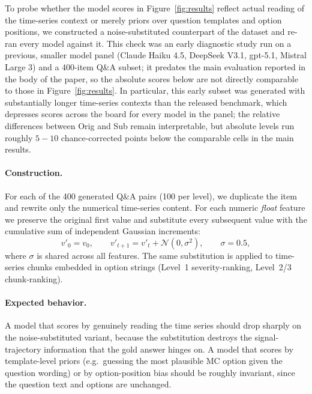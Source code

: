 \documentclass{article}
\begin{document}
To probe whether the model scores in Figure~\ref{fig:results} reflect actual reading of the time-series context or merely priors over question templates and option positions, we constructed a noise-substituted counterpart of the dataset and re-ran every model against it. This check was an early diagnostic study run on a previous, smaller model panel (Claude Haiku 4.5, DeepSeek V3.1, gpt-5.1, Mistral Large 3) and a 400-item Q\&A subset; it predates the main evaluation reported in the body of the paper, so the absolute scores below are not directly comparable to those in Figure~\ref{fig:results}. In particular, this early subset was generated with substantially longer time-series contexts than the released benchmark, which depresses scores across the board for every model in the panel; the relative differences between Orig and Sub remain interpretable, but absolute levels run roughly $5{-}10$ chance-corrected points below the comparable cells in the main results.

\paragraph{Construction.} For each of the 400 generated Q\&A pairs (100 per level), we duplicate the item and rewrite only the numerical time-series content. For each numeric \emph{float} feature we preserve the original first value and substitute every subsequent value with the cumulative sum of independent Gaussian increments:
\begin{equation*}
    v'_0 = v_0, \qquad v'_{t+1} = v'_t + \mathcal{N}(0, \sigma^2), \qquad \sigma = 0.5,
\end{equation*}
where $\sigma$ is shared across all features. The same substitution is applied to time-series chunks embedded in option strings (Level~1 severity-ranking, Level~2/3 chunk-ranking).

\paragraph{Expected behavior.} A model that scores by genuinely reading the time series should drop sharply on the noise-substituted variant, because the substitution destroys the signal-trajectory information that the gold answer hinges on. A model that scores by template-level priors (e.g.\ guessing the most plausible MC option given the question wording) or by option-position bias should be roughly invariant, since the question text and options are unchanged.
\end{document}
